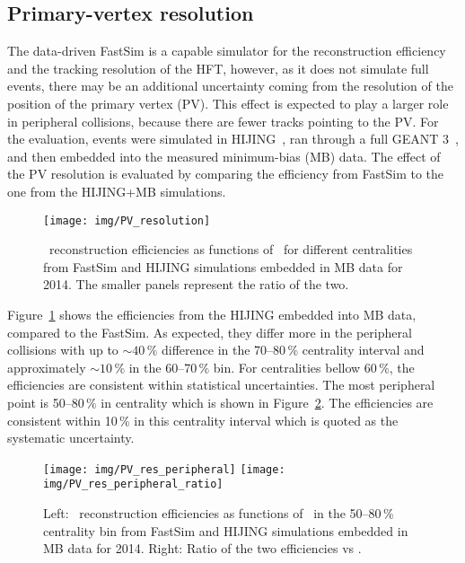 \subsection{Primary-vertex resolution}

The data-driven FastSim is a capable simulator for the reconstruction efficiency and the tracking resolution of the HFT, however, as it does not simulate full events, there may be an additional uncertainty coming from the resolution of the position of the primary vertex (PV)\@. This effect is expected to play a larger role in peripheral collisions, because there are fewer tracks pointing to the PV\@. For the evaluation, events were simulated in HIJING~\cite{HIJING}, ran through a full GEANT 3~\cite{GEANT}, and then embedded into the measured minimum-bias (MB) data. The effect of the PV resolution is evaluated by comparing the efficiency from FastSim to the one from the HIJING+MB simulations.

\begin{figure}[!htb]
\centering
\texttt{[image: img/PV\_resolution]}

\caption[\Lambdac\ reconstruction efficiencies from FastSim and HIJING simulations embedded in MB data for 2014]{\label{PV_resolution} \Lambdac\ reconstruction efficiencies as functions of \pt\ for different centralities from FastSim and HIJING simulations embedded in MB data for 2014. The smaller panels represent the ratio of the two.}
\end{figure}

Figure~\ref{PV_resolution} shows the efficiencies from the HIJING embedded into MB data, compared to the FastSim. As expected, they differ more in the peripheral collisions with up to $\sim40\,\%$ difference in the 70--80$\,\%$ centrality interval and approximately $\sim10\,\%$ in the 60--70$\,\%$ bin. For centralities bellow 60$\,\%$, the efficiencies are consistent within statistical uncertainties. The most peripheral point is 50--80$\,\%$ in centrality which is shown in Figure~\ref{PV_peripheral}\@. The efficiencies are consistent within 10$\,\%$ in this centrality interval which is quoted as the systematic uncertainty.

\begin{figure}[!htb]
\centering
\texttt{[image: img/PV\_res\_peripheral]}
\texttt{[image: img/PV\_res\_peripheral\_ratio]}
\caption[\Lambdac\ reconstruction efficiencies from FastSim and HIJING simulations embedded in MB data for 2014 and ratio of the two efficiencies.]{\label{PV_peripheral} Left: \Lambdac\ reconstruction efficiencies as functions of \pt\ in the 50--80\,\% centrality bin from FastSim and HIJING simulations embedded in MB data for 2014. Right: Ratio of the two efficiencies vs \pt.}
\end{figure}

